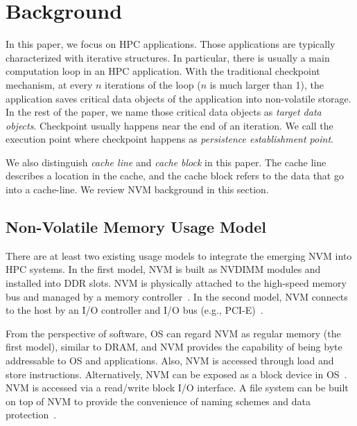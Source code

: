\section{Background}
\label{sec:bg}
In this paper, we focus on HPC applications.
Those applications are typically characterized with iterative structures.
In particular, there is usually a main computation loop in an HPC application. 
With the traditional checkpoint mechanism, at every $n$ iterations of the loop ($n$ is much larger than 1), the application saves critical data objects of the application into non-volatile storage. 
In the rest of the paper, we name those critical data objects as \textit{target data objects}. 
Checkpoint usually happens near the end of an iteration.
We call the execution point where checkpoint happens as \textit{persistence establishment point}. 

We also distinguish \textit{cache line} and \textit{cache block} in this paper.
The cache line describes a location in the cache, and the cache block
refers to the data that go into a cache-line. 
We review NVM background in this section.


\subsection{Non-Volatile Memory Usage Model}
There are at least two existing usage models to integrate the emerging NVM into 
HPC systems. 
In the first model, NVM is built as NVDIMM modules and installed 
into DDR slots. NVM is physically attached to the high-speed memory bus and managed by a memory controller~\cite{micro16:chen}. 
In the second model, NVM connects to the host
by an I/O controller and I/O bus (e.g., PCI-E)~\cite{msst14:chen}.  %

From the perspective of software, OS can regard NVM as regular memory (the first model), similar to DRAM, and NVM provides the capability of being byte addressable to OS and applications. Also, NVM is accessed through {\selectfont
load} and {\selectfont store} instructions.
Alternatively, NVM can be exposed as a block device in OS~\cite{usenix13:rudoff}. 
NVM is accessed via a read/write block I/O interface. 
A file system can be built on top of NVM
to provide the convenience of naming schemes and data protection~\cite{usenix13:rudoff}.

